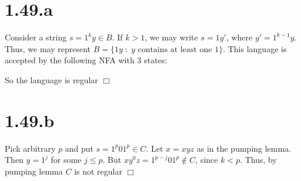 \documentclass{article}
\begin{document}
\section*{1.49.a}
Consider a string $s = 1^ky \in B$. If $k > 1$, we may write $s = 1y'$, where $y' = 1^{k-1}y$. Thus, we may represent $B = \{1y \;:\; y \text{ contains at least one 1}\}$. This language is accepted by the following NFA with $3$ states:


\noindent
So the language is regular $\Box$

\section*{1.49.b}
Pick arbitrary $p$ and put $s = 1^p01^p \in C$. Let $x = xyz$ as in the pumping lemma. Then $y = 1^{j}$ for some $j \leqslant p$. But $xy^0z = 1^{p-j}01^p \notin C$, since $k < p$. Thus, by pumping lemma $C$ is not regular $\Box$
\end{document}
